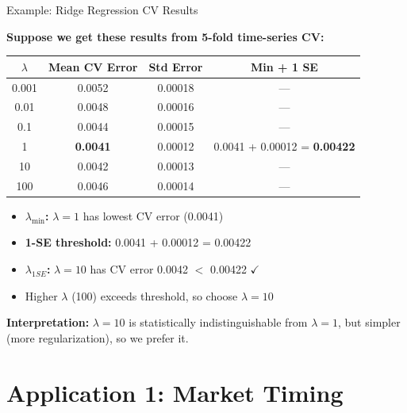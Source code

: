 \documentclass[10pt]{beamer}
\newcommand{\highlightgreen}[1]{\textcolor{AccentGreen}{\textbf{#1}}}
\begin{document}
\begin{frame}{Example: Ridge Regression CV Results}

\textbf{Suppose we get these results from 5-fold time-series CV:}

\begin{table}[h]
\centering
\small
\begin{tabular}{cccc}
\toprule
\textbf{$\lambda$} & \textbf{Mean CV Error} & \textbf{Std Error} & \textbf{Min + 1 SE} \\
\midrule
0.001 & 0.0052 & 0.00018 & --- \\
0.01  & 0.0048 & 0.00016 & --- \\
0.1   & 0.0044 & 0.00015 & --- \\
1     & \highlightgreen{0.0041} & 0.00012 & 0.0041 + 0.00012 = \highlightgreen{0.00422} \\
10    & 0.0042 & 0.00013 & --- \\
100   & 0.0046 & 0.00014 & --- \\
\bottomrule
\end{tabular}
\end{table}

\vspace{0.5em}
\begin{itemize}
  \item \textbf{$\lambda_{\min}$:} $\lambda = 1$ has lowest CV error (0.0041)
  \item \textbf{1-SE threshold:} 0.0041 + 0.00012 = 0.00422
  \item \textbf{$\lambda_{1SE}$:} $\lambda = 10$ has CV error 0.0042 $<$ 0.00422 $\checkmark$
  \item Higher $\lambda$ (100) exceeds threshold, so choose $\lambda = 10$
\end{itemize}

\vspace{0.5em}
\textbf{Interpretation:} $\lambda = 10$ is statistically indistinguishable from $\lambda = 1$, but simpler (more regularization), so we prefer it.
\end{frame}



\section{Application 1: Market Timing}
\end{document}
